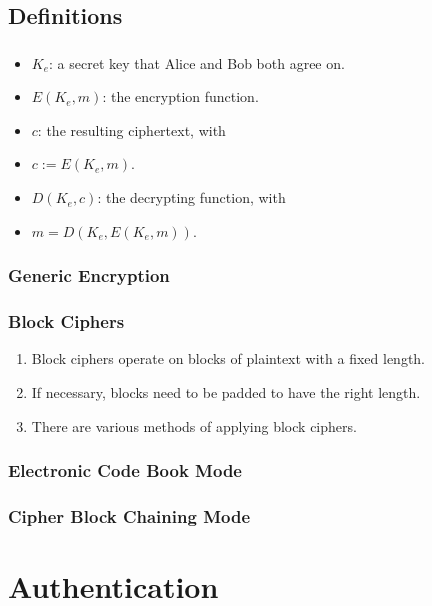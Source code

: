 \documentclass{beamer}
\begin{document}
    \subsection{Definitions}
      \begin{frame}
        \frametitle{\insertsubsection}
        \begin{itemize}
          \item $K_e$: a secret key that Alice and Bob both agree on.
          \item $E(K_e ,m)$: the encryption function.
          \item $c$: the resulting ciphertext, with
          \item $c:=E(K_e ,m)$.
          \item $D(K_e ,c)$: the decrypting function, with
          \item $m = D(K_e, E(K_e , m))$.
        \end{itemize}
      \end{frame}
      \begin{frame}
        \frametitle{Generic Encryption}
        \begin{center}
          
        \end{center}
      \end{frame}
      \begin{frame}
        \frametitle{Block Ciphers}
        \begin{enumerate}
          \item Block ciphers operate on blocks of plaintext with a fixed length.
          \item If necessary, blocks need to be padded to have the right length.
          \item There are various methods of applying block ciphers.
        \end{enumerate}
      \end{frame}
      \begin{frame}
        \frametitle{Electronic Code Book Mode}
        \resizebox{\textwidth}{!}{%
        }
      \end{frame}
      \begin{frame}
        \frametitle{Cipher Block Chaining Mode}
        \resizebox{\textwidth}{!}{%
        }
      \end{frame}
  \section{Authentication}
\end{document}
